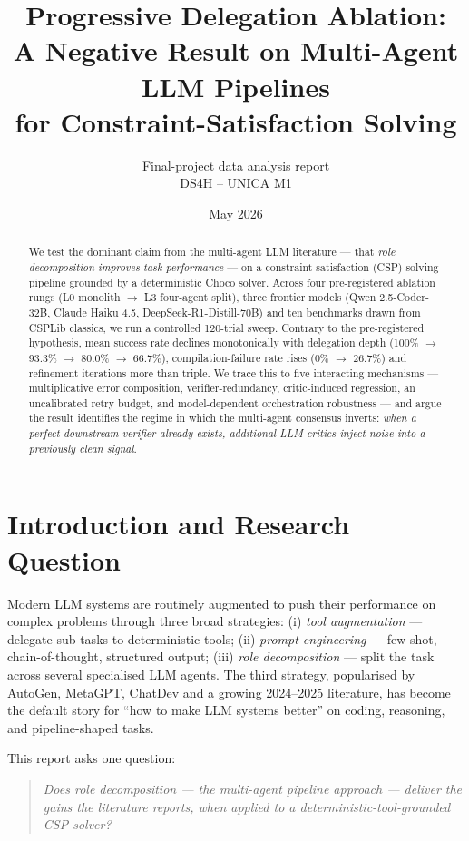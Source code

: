 \documentclass[11pt,a4paper]{article}
\title{\textbf{Progressive Delegation Ablation:\\[2pt]
A Negative Result on Multi-Agent LLM Pipelines\\[2pt]
for Constraint-Satisfaction Solving}}
\author{Final-project data analysis report\\\small DS4H -- UNICA M1}
\date{May 2026}
\begin{document}
\maketitle

\begin{abstract}
\small
We test the dominant claim from the multi-agent LLM literature --- that
\emph{role decomposition improves task performance} --- on a constraint
satisfaction (CSP) solving pipeline grounded by a deterministic Choco solver.
Across four pre-registered ablation rungs (L0 monolith $\to$ L3 four-agent
split), three frontier models (Qwen 2.5-Coder-32B, Claude Haiku 4.5,
DeepSeek-R1-Distill-70B) and ten benchmarks drawn from CSPLib classics, we
run a controlled 120-trial sweep. Contrary to the pre-registered hypothesis,
mean success rate declines monotonically with delegation depth
(100\% $\to$ 93.3\% $\to$ 80.0\% $\to$ 66.7\%), compilation-failure rate
rises (0\% $\to$ 26.7\%) and refinement iterations more than triple. We
trace this to five interacting mechanisms --- multiplicative error
composition, verifier-redundancy, critic-induced regression, an
uncalibrated retry budget, and model-dependent orchestration robustness ---
and argue the result identifies the regime in which the multi-agent
consensus inverts: \emph{when a perfect downstream verifier already exists,
additional LLM critics inject noise into a previously clean signal}.
\end{abstract}

\section{Introduction and Research Question}

Modern LLM systems are routinely augmented to push their performance on complex
problems through three broad strategies: (i) \emph{tool augmentation} --- delegate
sub-tasks to deterministic tools; (ii) \emph{prompt engineering} --- few-shot,
chain-of-thought, structured output; (iii) \emph{role decomposition} --- split
the task across several specialised LLM agents. The third strategy, popularised
by AutoGen, MetaGPT, ChatDev and a growing 2024--2025 literature, has become
the default story for ``how to make LLM systems better'' on coding, reasoning,
and pipeline-shaped tasks.

This report asks one question:

\begin{quote}\itshape
Does role decomposition --- the multi-agent pipeline approach --- deliver
the gains the literature reports, when applied to a deterministic-tool-grounded
CSP solver?
\end{quote}
\end{document}
